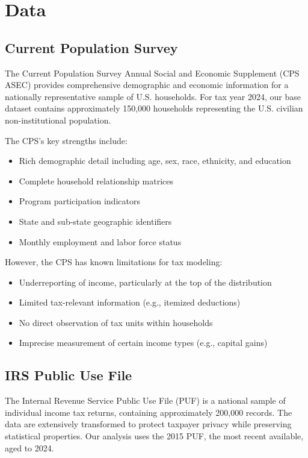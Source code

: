 \section{Data}

\subsection{Current Population Survey}

The Current Population Survey Annual Social and Economic Supplement (CPS ASEC) provides comprehensive demographic and economic information for a nationally representative sample of U.S. households. For tax year 2024, our base dataset contains approximately 150,000 households representing the U.S. civilian non-institutional population.

The CPS's key strengths include:
\begin{itemize}
    \item Rich demographic detail including age, sex, race, ethnicity, and education
    \item Complete household relationship matrices
    \item Program participation indicators
    \item State and sub-state geographic identifiers
    \item Monthly employment and labor force status
\end{itemize}

However, the CPS has known limitations for tax modeling:
\begin{itemize}
    \item Underreporting of income, particularly at the top of the distribution
    \item Limited tax-relevant information (e.g., itemized deductions)
    \item No direct observation of tax units within households
    \item Imprecise measurement of certain income types (e.g., capital gains)
\end{itemize}

\subsection{IRS Public Use File}

The Internal Revenue Service Public Use File (PUF) is a national sample of individual income tax returns, containing approximately 200,000 records. The data are extensively transformed to protect taxpayer privacy while preserving statistical properties. Our analysis uses the 2015 PUF, the most recent available, aged to 2024.

